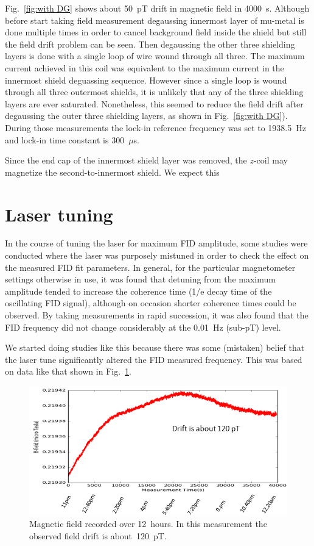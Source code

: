 Fig.~\ref{fig:with DG} shows about 50~pT drift in magnetic field in
4000~s. Although before start taking field measurement degaussing
innermost layer of mu-metal is done multiple times in order to cancel
background field inside the shield but still the field drift problem
can be seen. Then degaussing the other three shielding layers is done
with a single loop of wire wound through all three.  The maximum
current achieved in this coil was equivalent to the maximum current in
the innermost shield deguassing sequence.  However since a single loop
is wound through all three outermost shields, it is unlikely that any
of the three shielding layers are ever saturated.  Nonetheless, this
seemed to reduce the field drift after degaussing the outer three
shielding layers, as shown in Fig.~\ref{fig:with DG}). During those
measurements the lock-in reference frequency was set to 1938.5~Hz and
lock-in time constant is 300~$\mu$s.

Since the end cap of the innermost shield layer was removed, the
$z$-coil may magnetize the second-to-innermost shield.  We expect this 

\section{Laser tuning} 

In the course of tuning the laser for maximum FID amplitude, some
studies were conducted where the laser was purposely mistuned in order
to check the effect on the measured FID fit parameters.  In general,
for the particular magnetometer settings otherwise in use, it was
found that detuning from the maximum amplitude tended to increase the
coherence time (1/e decay time of the oscillating FID signal),
although on occasion shorter coherence times could be observed.  By
taking measurements in rapid succession, it was also found that the
FID frequency did not change considerably at the 0.01~Hz (sub-pT)
level.

We started doing studies like this because there was some (mistaken)
belief that the laser tune significantly altered the FID measured
frequency.  This was based on data like that shown in
Fig.~\ref{fig:digilock-drift}.

\begin{figure}%
  \centering\includegraphics[width=0.6\linewidth]{figures/field_drift}
  \caption{Magnetic field recorded over 12~hours.  In this
    measurement the observed field drift is
    about~120~pT.\label{fig:digilock-drift}}
\end{figure}

